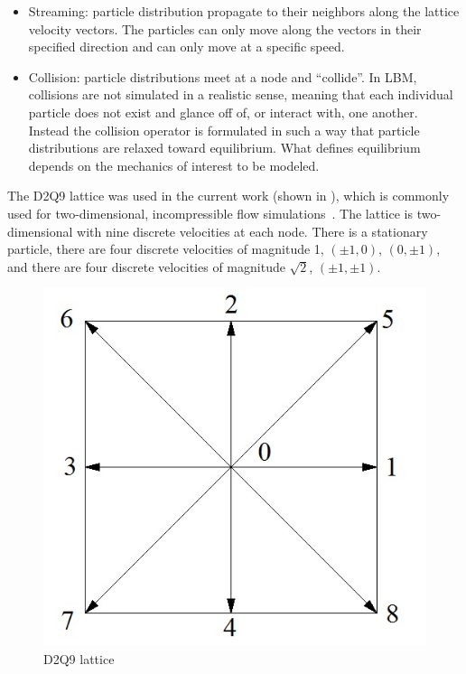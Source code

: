 \documentclass{article}
\begin{document}
\begin{itemize}
\item Streaming: particle distribution propagate to their neighbors along the lattice velocity vectors.
The particles can only move along the vectors in their specified direction and can only move at a specific speed.
\item Collision: particle distributions meet at a node and ``collide''.
In LBM, collisions are not simulated in a realistic sense, meaning that each individual particle does not exist and glance off of, or interact with, one another.
Instead the collision operator is formulated in such a way that particle distributions are relaxed toward equilibrium.
What defines equilibrium depends on the mechanics of interest to be modeled.
\end{itemize}

The D2Q9 lattice was used in the current work (shown in ), which is commonly used for two-dimensional, incompressible flow simulations~\cite{Suc01}. %
The lattice is two-dimensional with nine discrete velocities at each node.
There is a stationary particle, there are four discrete velocities of magnitude 1, $(\pm1,0)$, $(0,\pm1)$, and there are four discrete velocities of magnitude $\sqrt{2}$, $(\pm1, \pm1)$.

\begin{figure}
  \includegraphics[]{figs/d2q9}
  \caption{D2Q9 lattice}
  \label{fig:d2q9}
\end{figure}
\end{document}
